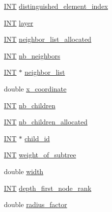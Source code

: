 \begin{DoxyCompactItemize}
\item 
\mbox{\hyperlink{galois_8h_a09fddde158a3a20bd2dcadb609de11dc}{I\+NT}} \mbox{\hyperlink{classgraph__node_ae0236433b38818acc40e63366e1e8dfc}{distinguished\+\_\+element\+\_\+index}}
\item 
\mbox{\hyperlink{galois_8h_a09fddde158a3a20bd2dcadb609de11dc}{I\+NT}} \mbox{\hyperlink{classgraph__node_a17771cc1fe777aa2cfcc1ee81b729695}{layer}}
\item 
\mbox{\hyperlink{galois_8h_a09fddde158a3a20bd2dcadb609de11dc}{I\+NT}} \mbox{\hyperlink{classgraph__node_ad71acb705124a69135d623c5b323086a}{neighbor\+\_\+list\+\_\+allocated}}
\item 
\mbox{\hyperlink{galois_8h_a09fddde158a3a20bd2dcadb609de11dc}{I\+NT}} \mbox{\hyperlink{classgraph__node_a0c7c709816eeca67fb8b13659b5c2349}{nb\+\_\+neighbors}}
\item 
\mbox{\hyperlink{galois_8h_a09fddde158a3a20bd2dcadb609de11dc}{I\+NT}} $\ast$ \mbox{\hyperlink{classgraph__node_adf12ab2cd0998ff629b3d96c09df9fe8}{neighbor\+\_\+list}}
\item 
double \mbox{\hyperlink{classgraph__node_a6788a7382a4f4f5eecbecff5b4a14a00}{x\+\_\+coordinate}}
\item 
\mbox{\hyperlink{galois_8h_a09fddde158a3a20bd2dcadb609de11dc}{I\+NT}} \mbox{\hyperlink{classgraph__node_ab6ce9c840cfd6f61f1ae6b08b7a582f2}{nb\+\_\+children}}
\item 
\mbox{\hyperlink{galois_8h_a09fddde158a3a20bd2dcadb609de11dc}{I\+NT}} \mbox{\hyperlink{classgraph__node_ace5a2cc859ee4a2767d9dd0676f7b5bf}{nb\+\_\+children\+\_\+allocated}}
\item 
\mbox{\hyperlink{galois_8h_a09fddde158a3a20bd2dcadb609de11dc}{I\+NT}} $\ast$ \mbox{\hyperlink{classgraph__node_a7ebfc3f050c382bcd5f4403d31e637d2}{child\+\_\+id}}
\item 
\mbox{\hyperlink{galois_8h_a09fddde158a3a20bd2dcadb609de11dc}{I\+NT}} \mbox{\hyperlink{classgraph__node_ad51cb8fe106238546098c8fcf14c0a36}{weight\+\_\+of\+\_\+subtree}}
\item 
double \mbox{\hyperlink{classgraph__node_ae07874f8faa7463ce52349c4e48d1d1c}{width}}
\item 
\mbox{\hyperlink{galois_8h_a09fddde158a3a20bd2dcadb609de11dc}{I\+NT}} \mbox{\hyperlink{classgraph__node_aca9331f8c7b816076e045ca355135bf5}{depth\+\_\+first\+\_\+node\+\_\+rank}}
\item 
double \mbox{\hyperlink{classgraph__node_a760c2bed2266fc1876a93acc3b5ec29e}{radius\+\_\+factor}}
\end{DoxyCompactItemize}


